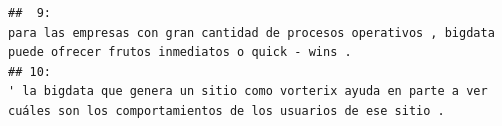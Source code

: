 \documentclass[
]{book}
\newenvironment{Shaded}{\begin{snugshade}}{\end{snugshade}}
\newcommand{\AttributeTok}[1]{\textcolor[rgb]{0.77,0.63,0.00}{#1}}
\newcommand{\DecValTok}[1]{\textcolor[rgb]{0.00,0.00,0.81}{#1}}
\newcommand{\FunctionTok}[1]{\textcolor[rgb]{0.00,0.00,0.00}{#1}}
\newcommand{\NormalTok}[1]{#1}
\newcommand{\SpecialCharTok}[1]{\textcolor[rgb]{0.00,0.00,0.00}{#1}}
\newcommand{\StringTok}[1]{\textcolor[rgb]{0.31,0.60,0.02}{#1}}
\begin{document}
\begin{verbatim}
##  9:                                                                                                                                                  para las empresas con gran cantidad de procesos operativos , bigdata puede ofrecer frutos inmediatos o quick - wins .
## 10:                                                                                                                                      ' la bigdata que genera un sitio como vorterix ayuda en parte a ver cuáles son los comportamientos de los usuarios de ese sitio .
\end{verbatim}

\begin{Shaded}
\end{Shaded}
\end{document}
